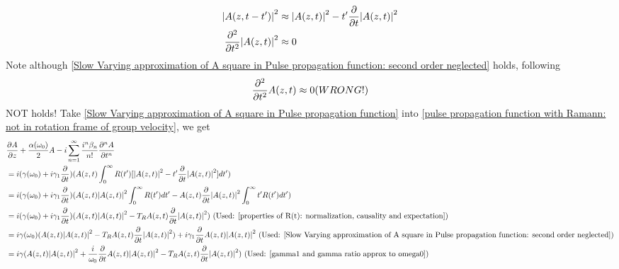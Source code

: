\documentclass[12pt]{extarticle}
\numberwithin{equation}{section}
\numberwithin{figure}{section}
\numberwithin{table}{section}
\newcommand{\<}{\langle}
\renewcommand{\>}{\rangle}
\theoremstyle{definition}
\begin{document}
\begin{itemize}
\begin{subequations}
\begin{align}
                    \abs{A(z,t-t^\prime)}^2 &\approx \abs{A(z,t)}^2-t^\prime \pdv{}{t}\abs{A(z,t)}^2\label{Slow Varying approximation of A square in Pulse propagation function: expansion}\\
                    \pdv[2]{}{t}\abs{A(z,t)}^2 & \approx 0\label{Slow Varying approximation of A square in Pulse propagation function: second order neglected}
                \end{align}
                \label{Slow Varying approximation of A square in Pulse propagation function}
                \end{subequations}
                Note although \autoref{Slow Varying approximation of A square in Pulse propagation function: second order neglected} holds, following
                \begin{equation*}
                    \pdv[2]{}{t}A(z,t) \approx 0 (WRONG!)
                \end{equation*}
                NOT holds!
                Take \autoref{Slow Varying approximation of A square in Pulse propagation function} into \autoref{pulse propagation function with Ramann: not in rotation frame of group velocity}, we get
                \begin{equation}
                \allowdisplaybreaks
                \begin{split}
                    &\pdv{A}{z}+\frac{\alpha(\omega_0)}{2}A-i\sum_{n=1}^\infty \frac{i^n \beta_n}{n!}\pdv[n]{A}{t}\\
                    &=i(\gamma(\omega_0)+i\gamma_1\pdv{}{t})(A(z,t)\int_0^\infty R(t^\prime)[\abs{A(z,t)}^2-t^\prime \pdv{}{t}\abs{A(z,t)}^2]dt^\prime )\\
                    &=i(\gamma(\omega_0)+i\gamma_1\pdv{}{t})(A(z,t)\abs{A(z,t)}^2\int_0^\infty R(t^\prime)dt^\prime-A(z,t)\pdv{}{t}\abs{A(z,t)}^2\int_0^\infty t^\prime R(t^\prime)dt^\prime )\\
                    &=i(\gamma(\omega_0)+i\gamma_1\pdv{}{t})(A(z,t)\abs{A(z,t)}^2-T_R A(z,t)\pdv{}{t}\abs{A(z,t)}^2 ) \mbox{ (Used: \autoref{properties of R(t): normalization, causality and expectation})}\\
                    &=i\gamma(\omega_0)(A(z,t)\abs{A(z,t)}^2-T_R A(z,t)\pdv{}{t}\abs{A(z,t)}^2)+i\gamma_1\pdv{}{t}A(z,t)\abs{A(z,t)}^2\mbox{ (Used: \autoref{Slow Varying approximation of A square in Pulse propagation function: second order neglected})}\\
                    &=i\gamma(A(z,t)\abs{A(z,t)}^2+\frac{i}{\omega_0}\pdv{}{t}A(z,t)\abs{A(z,t)}^2-T_R A(z,t)\pdv{}{t}\abs{A(z,t)}^2) \mbox{ (Used: \autoref{gamma1 and gamma ratio approx to omega0})}

\end{split}
\end{equation}
\end{itemize}
\end{document}
